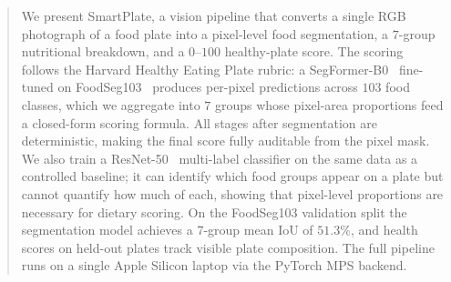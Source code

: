 \begin{abstract}
We present SmartPlate, a vision pipeline that converts a single RGB photograph of a food plate into a pixel-level food segmentation, a $7$-group nutritional breakdown, and a $0$--$100$ healthy-plate score.
The scoring follows the Harvard Healthy Eating Plate rubric: a SegFormer-B0~\cite{xie2021segformer} fine-tuned on FoodSeg103~\cite{wu2021foodseg103} produces per-pixel predictions across $103$ food classes, which we aggregate into $7$ groups whose pixel-area proportions feed a closed-form scoring formula.
All stages after segmentation are deterministic, making the final score fully auditable from the pixel mask.
We also train a ResNet-50~\cite{he2016resnet} multi-label classifier on the same data as a controlled baseline; it can identify which food groups appear on a plate but cannot quantify how much of each, showing that pixel-level proportions are necessary for dietary scoring.
On the FoodSeg103 validation split the segmentation model achieves a $7$-group mean IoU of $51.3\%$, and health scores on held-out plates track visible plate composition.
The full pipeline runs on a single Apple Silicon laptop via the PyTorch MPS backend.
\end{abstract}

